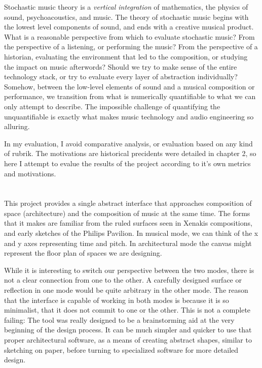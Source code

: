 Stochastic music theory is a \textit{vertical integration} of
mathematics, the physics of sound, psychoacoustics, and music. The
theory of stochastic music begins with the lowest level components of
sound, and ends with a creative musical product. What is a reasonable
perspective from which to evaluate stochastic music? From the
perspective of a listening, or performing the music? From the
perspective of a historian, evaluating the environment that led to the
composition, or studying the impact on music afterwords?  Should we
try to make sense of the entire technology stack, or try to evaluate
every layer of abstraction individually? Somehow, between the
low-level elements of sound and a musical composition or performance,
we transition from what is numerically quantifiable to what we can
only attempt to describe. The impossible challenge of quantifying the
unquantifiable is exactly what makes music technology and audio
engineering so alluring.

In my evaluation, I avoid comparative analysis, or evaluation based on
any kind of rubrik. The motivations are historical precidents were
detailed in chapter 2, so here I attempt to evalue the results of the
project according to it's own metrics and motivations.


\section{}
This project provides a single abstract interface that approaches
composition of space (architecture) and the composition of music at
the same time. The forms that it makes are familiar from the ruled
surfaces seen in Xenakis compositions, and early sketches of the
Philips Pavilion. In musical mode, we can think of the x and y axes
representing time and pitch. In architectural mode the canvas might
represent the floor plan of spaces we are designing.

While it is interesting to switch our perspective between the two
modes, there is not a clear connection from one to the other. A
carefully designed surface or reflection in one mode would be quite
arbitrary in the other mode. The reason that the interface is capable
of working in both modes is because it is so minimalist, that it does
not commit to one or the other. This is not a complete failing: The
tool was really designed to be a brainstorming aid at the very
beginning of the design process. It can be much simpler and quicker to
use that proper architectural software, as a means of creating
abstract shapes, similar to sketching on paper, before turning to
specialized software for more detailed design.

